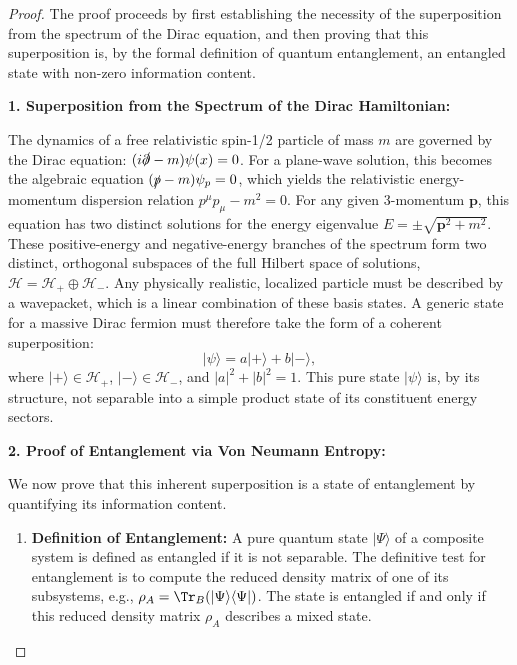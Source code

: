 \documentclass[11pt, letterpaper]{report}
\theoremstyle{plain} %
\theoremstyle{definition} %
\theoremstyle{remark} %
\begin{document}
\begin{proof}
The proof proceeds by first establishing the necessity of the superposition from the spectrum of the Dirac equation, and then proving that this superposition is, by the formal definition of quantum entanglement, an entangled state with non-zero information content.

\textbf{1. Superposition from the Spectrum of the Dirac Hamiltonian:}

The dynamics of a free relativistic spin-1/2 particle of mass $m$ are governed by the Dirac equation: $(i\slashed{\partial} - m) \psi(x) = 0$. For a plane-wave solution, this becomes the algebraic equation $(\slashed{p} - m)\psi_p = 0$, which yields the relativistic energy-momentum dispersion relation $p^\mu p_\mu - m^2 = 0$. For any given 3-momentum $\mathbf{p}$, this equation has two distinct solutions for the energy eigenvalue $E = \pm \sqrt{\mathbf{p}^2 + m^2}$. These positive-energy and negative-energy branches of the spectrum form two distinct, orthogonal subspaces of the full Hilbert space of solutions, $\mathcal{H} = \mathcal{H}_+ \oplus \mathcal{H}_-$. Any physically realistic, localized particle must be described by a wavepacket, which is a linear combination of these basis states. A generic state for a massive Dirac fermion must therefore take the form of a coherent superposition:
\begin{equation}
    |\psi\rangle = a |+ \rangle + b |-\rangle,
\end{equation}
where $|+\rangle \in \mathcal{H}_+$, $|-\rangle \in \mathcal{H}_-$, and $|a|^2+|b|^2=1$. This pure state $|\psi\rangle$ is, by its structure, not separable into a simple product state of its constituent energy sectors.

\textbf{2. Proof of Entanglement via Von Neumann Entropy:}

We now prove that this inherent superposition is a state of entanglement by quantifying its information content.
\begin{enumerate}[label=(\alph*)] %
    \item \textbf{Definition of Entanglement:} A pure quantum state $|\Psi\rangle$ of a composite system is defined as entangled if it is not separable. The definitive test for entanglement is to compute the reduced density matrix of one of its subsystems, e.g., $\rho_A = \Tr_B(|\Psi\rangle\langle\Psi|)$. The state is entangled if and only if this reduced density matrix $\rho_A$ describes a mixed state.


\end{enumerate}
\end{proof}
\end{document}
